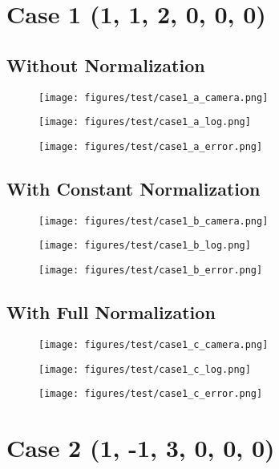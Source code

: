 \section{Case 1 (1, 1, 2, 0, 0, 0)}
\subsection{Without Normalization}
\begin{figure}[ht!] \centering \texttt{[image: figures/test/case1\_a\_camera.png]} \end{figure}
\begin{figure}[ht!] \centering \texttt{[image: figures/test/case1\_a\_log.png]} \end{figure}
\begin{figure}[ht!] \centering \texttt{[image: figures/test/case1\_a\_error.png]} \end{figure}
\clearpage
\subsection{With Constant Normalization}
\begin{figure}[ht!] \centering \texttt{[image: figures/test/case1\_b\_camera.png]} \end{figure}
\begin{figure}[ht!] \centering \texttt{[image: figures/test/case1\_b\_log.png]} \end{figure}
\begin{figure}[ht!] \centering \texttt{[image: figures/test/case1\_b\_error.png]} \end{figure}
\clearpage
\subsection{With Full Normalization}
\begin{figure}[ht!] \centering \texttt{[image: figures/test/case1\_c\_camera.png]} \end{figure}
\begin{figure}[ht!] \centering \texttt{[image: figures/test/case1\_c\_log.png]} \end{figure}
\begin{figure}[ht!] \centering \texttt{[image: figures/test/case1\_c\_error.png]} \end{figure}
\clearpage

\section{Case 2 (1, -1, 3, 0, 0, 0)}
